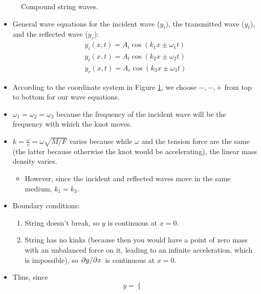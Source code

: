 \documentclass[../notes.tex]{subfiles}
\begin{document}
\begin{itemize}
\begin{figure}[H]
        \caption{Compound string waves.}
        \label{fig:compoundString}
    \end{figure}
    \begin{itemize}
        \item General wave equations for the incident wave ($y_i$), the transmitted wave ($y_t$), and the reflected wave ($y_r$):
        \begin{gather*}
            y_i(x,t) = A_i\cos(k_1x\pm\omega_1t)\\
            y_t(x,t) = A_t\cos(k_2x\pm\omega_2t)\\
            y_r(x,t) = A_r\cos(k_3x\pm\omega_3t)
        \end{gather*}
        \item According to the coordinate system in Figure \ref{fig:compoundString}, we choose $-,-,+$ from top to bottom for our wave equations.
        \item $\omega_1=\omega_2=\omega_3$ because the frequency of the incident wave will be the frequency with which the knot moves.
        \item $k=\frac{\omega}{v}=\omega\sqrt{M/F}$ varies because while $\omega$ and the tension force are the same (the latter because otherwise the knot would be accelerating), the linear mass density varies.
        \begin{itemize}
            \item However, since the incident and reflected waves move in the same medium, $k_1=k_3$.
        \end{itemize}
        \item Boundary conditions:
        \begin{enumerate}
            \item String doesn't break, so $y$ is continuous at $x=0$.
            \item String has no kinks (because then you would have a point of zero mass with an unbalanced force on it, leading to an infinite acceleration, which is impossible), so $\pdv*{y}{x}$ is continuous at $x=0$.
        \end{enumerate}
        \item Thus, since
        \begin{equation*}
            y =
            \begin{cases}

\end{cases}
\end{equation*}
\end{itemize}
\end{itemize}
\end{document}
